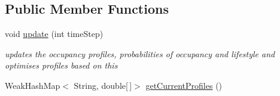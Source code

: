 \subsection*{Public Member Functions}
\begin{DoxyCompactItemize}
\item 
\hypertarget{classuk_1_1ac_1_1dmu_1_1iesd_1_1cascade_1_1controllers_1_1_original_proportional_wattbox_controller_a419b1e9dfb3b87b74dcba1d128a11a70}{void \hyperlink{classuk_1_1ac_1_1dmu_1_1iesd_1_1cascade_1_1controllers_1_1_original_proportional_wattbox_controller_a419b1e9dfb3b87b74dcba1d128a11a70}{update} (int time\-Step)}\label{classuk_1_1ac_1_1dmu_1_1iesd_1_1cascade_1_1controllers_1_1_original_proportional_wattbox_controller_a419b1e9dfb3b87b74dcba1d128a11a70}

\begin{DoxyCompactList}\small\item\em updates the occupancy profiles, probabilities of occupancy and lifestyle and optimises profiles based on this \end{DoxyCompactList}\item 
\hypertarget{classuk_1_1ac_1_1dmu_1_1iesd_1_1cascade_1_1controllers_1_1_original_proportional_wattbox_controller_a6f36db8353d50927ae4c46f167dee480}{Weak\-Hash\-Map$<$ String, double\mbox{[}$\,$\mbox{]}$>$ \hyperlink{classuk_1_1ac_1_1dmu_1_1iesd_1_1cascade_1_1controllers_1_1_original_proportional_wattbox_controller_a6f36db8353d50927ae4c46f167dee480}{get\-Current\-Profiles} ()}\label{classuk_1_1ac_1_1dmu_1_1iesd_1_1cascade_1_1controllers_1_1_original_proportional_wattbox_controller_a6f36db8353d50927ae4c46f167dee480}


\end{DoxyCompactItemize}
